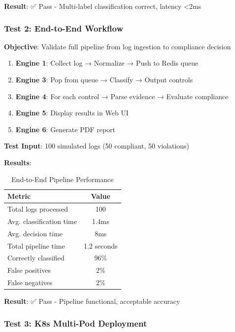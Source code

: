 \documentclass[11pt,conference]{IEEEtran}
\begin{document}
\textbf{Result}: ✅ Pass - Multi-label classification correct, latency <2ms

\subsubsection{Test 2: End-to-End Workflow}

\textbf{Objective}: Validate full pipeline from log ingestion to compliance decision

\begin{enumerate}
    \item \textbf{Engine 1}: Collect log → Normalize → Push to Redis queue
    \item \textbf{Engine 3}: Pop from queue → Classify → Output controls
    \item \textbf{Engine 4}: For each control → Parse evidence → Evaluate compliance
    \item \textbf{Engine 5}: Display results in Web UI
    \item \textbf{Engine 6}: Generate PDF report
\end{enumerate}

\textbf{Test Input}: 100 simulated logs (50 compliant, 50 violations)

\textbf{Results}:
\begin{table}[h]
\centering
\caption{End-to-End Pipeline Performance}
\begin{tabular}{|l|c|}
\hline
\textbf{Metric} & \textbf{Value} \\
\hline
Total logs processed & 100 \\
\hline
Avg. classification time & 1.4ms \\
\hline
Avg. decision time & 8ms \\
\hline
Total pipeline time & 1.2 seconds \\
\hline
Correctly classified & 96\% \\
\hline
False positives & 2\% \\
\hline
False negatives & 2\% \\
\hline
\end{tabular}
\end{table}

\textbf{Result}: ✅ Pass - Pipeline functional, acceptable accuracy

\subsubsection{Test 3: K8s Multi-Pod Deployment}
\end{document}
